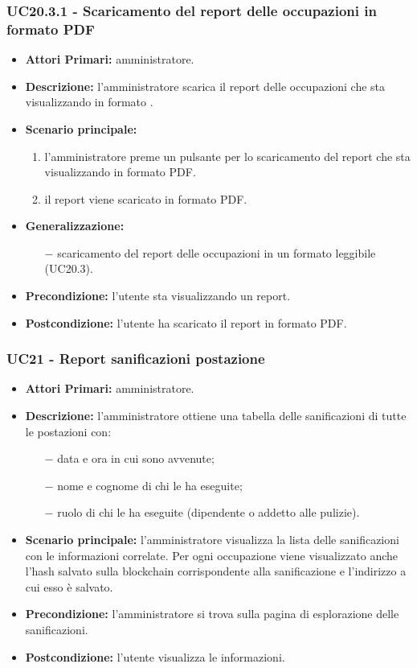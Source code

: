 \subsubsection{ UC20.3.1 - Scaricamento del report delle occupazioni in formato PDF}
\begin{itemize}
	\item\textbf{Attori Primari:} 
	amministratore.
	\item\textbf{Descrizione:} 
	l'amministratore scarica il report delle occupazioni che sta visualizzando in formato .
	\item\textbf{Scenario principale:} 
	\begin{enumerate}
		\item l'amministratore preme un pulsante per lo scaricamento del report che sta visualizzando in formato PDF.
		\item il report viene scaricato in formato PDF.
	\end{enumerate}
	\item\textbf{Generalizzazione:}
	\begin{itemize}
		\item[$-$] scaricamento del report delle occupazioni in un formato leggibile (UC20.3).
	\end{itemize}
	\item\textbf{Precondizione:} 
	l'utente sta visualizzando un report.
	\item\textbf{Postcondizione:}
	l'utente ha scaricato il report in formato PDF.
\end{itemize}


\subsubsection{ UC21 - Report sanificazioni postazione}
\begin{itemize}
           	\item\textbf{Attori Primari:} 
           	amministratore.
           	\item\textbf{Descrizione:} 
           	l'amministratore ottiene una tabella delle sanificazioni di tutte le postazioni con:
           	\begin{itemize}
           		\item[$-$] data e ora in cui sono avvenute;
           		\item[$-$] nome e cognome di chi le ha eseguite;
           		\item[$-$] ruolo di chi le ha eseguite (dipendente o addetto alle pulizie).
           	\end{itemize}
           	\item\textbf{Scenario principale:} 
           	l'amministratore visualizza la lista delle sanificazioni con le informazioni correlate. Per ogni occupazione viene visualizzato anche l'hash salvato sulla blockchain corrispondente alla sanificazione e l'indirizzo a cui esso è salvato.
           	\item\textbf{Precondizione:} 
           	l'amministratore si trova sulla pagina di esplorazione delle sanificazioni.
           	\item\textbf{Postcondizione:}
           	l'utente visualizza le informazioni.
\end{itemize}


